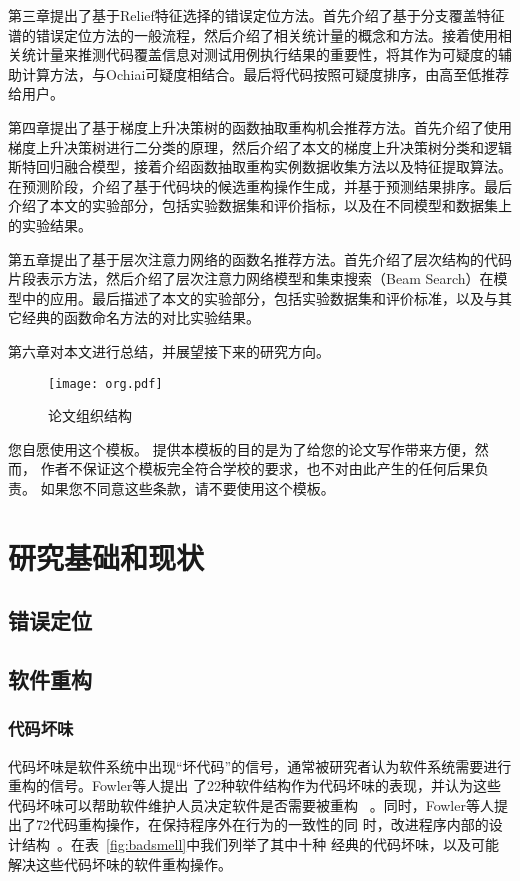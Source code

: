第三章提出了基于Relief特征选择的错误定位方法。首先介绍了基于分支覆盖特征谱的错误定位方法的一般流程，然后介绍了相关统计量的概念和方法。接着使用相关统计量来推测代码覆盖信息对测试用例执行结果的重要性，将其作为可疑度的辅助计算方法，与Ochiai可疑度相结合。最后将代码按照可疑度排序，由高至低推荐给用户。

第四章提出了基于梯度上升决策树的函数抽取重构机会推荐方法。首先介绍了使用梯度上升决策树进行二分类的原理，然后介绍了本文的梯度上升决策树分类和逻辑斯特回归融合模型，接着介绍函数抽取重构实例数据收集方法以及特征提取算法。在预测阶段，介绍了基于代码块的候选重构操作生成，并基于预测结果排序。最后介绍了本文的实验部分，包括实验数据集和评价指标，以及在不同模型和数据集上的实验结果。

第五章提出了基于层次注意力网络的函数名推荐方法。首先介绍了层次结构的代码片段表示方法，然后介绍了层次注意力网络模型和集束搜索（Beam Search）在模型中的应用。最后描述了本文的实验部分，包括实验数据集和评价标准，以及与其它经典的函数命名方法的对比实验结果。

第六章对本文进行总结，并展望接下来的研究方向。

\begin{figure}[htp]
  \centering
  \texttt{[image: org.pdf]}
  \caption{论文组织结构}
  \label{fig:org}
\end{figure}



您自愿使用这个模板。
提供本模板的目的是为了给您的论文写作带来方便，然而，
作者不保证这个模板完全符合学校的要求，也不对由此产生的任何后果负责。
如果您不同意这些条款，请不要使用这个模板。



\chapter{研究基础和现状}
\section{错误定位}
\section{软件重构}
\subsection{代码坏味}
代码坏味是软件系统中出现``坏代码''的信号，通常被研究者认为软件系统需要进行重构的信号。Fowler等人提出
了22种软件结构作为代码坏味的表现，并认为这些代码坏味可以帮助软件维护人员决定软件是否需要被重构
~\cite{fowler1999refactoring}。同时，Fowler等人提出了72代码重构操作，在保持程序外在行为的一致性的同
时，改进程序内部的设计结构~\cite{fowler1999refactoring}。在表~\ref{fig:badsmell}中我们列举了其中十种
经典的代码坏味，以及可能解决这些代码坏味的软件重构操作。

